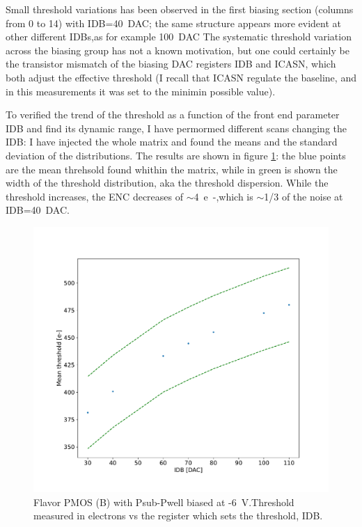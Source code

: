     
    
    
        Small threshold variations has been observed in the first biasing section (columns from 0 to 14) with IDB=\SI{40}{DAC}; the same structure appears more evident at other different IDBs,as for example \SI{100}{DAC}
        The systematic threshold variation across the biasing group has not a known motivation, but one could certainly be the transistor mismatch of the biasing DAC registers IDB and ICASN, which both adjust the effective threshold (I recall that ICASN regulate the baseline, and in this measurements it was set to the minimin possible value).


        To verified the trend of the threshold as a function of the front end parameter IDB and find its dynamic range, I have permormed different scans changing the IDB: I have injected the whole matrix and found the means and the standard deviation of the distributions. The results are shown in figure \ref{fig:threshold_vs_IDB}: the blue points are the mean threhsold found whithin the matrix, while in green is shown the width of the threshold distribution, aka the threshold dispersion. 
        While the threshold increases, the ENC decreases of $\sim$\SI{4}{e-},which is $\sim$1/3 of the noise at IDB=\SI{40}{DAC}. 
        \begin{figure}[h!]
            \centering
            \includegraphics[width=.70\linewidth]{figures/charaterization/thr_vs_IDB.pdf}
            \caption{Flavor PMOS (B) with Psub-Pwell biased at -\SI{6}{V}.Threshold measured in electrons vs the register which sets the threshold, IDB.  }
            \label{fig:threshold_vs_IDB}
        \end{figure}            

